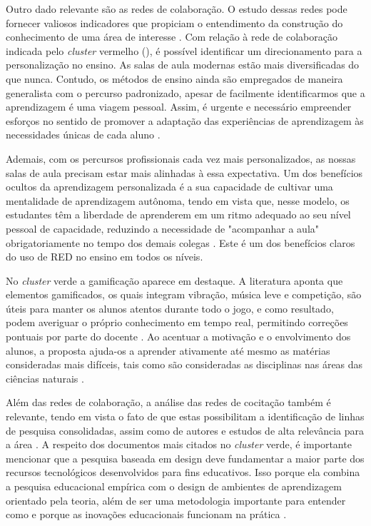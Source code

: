 \documentclass[portuguese]{textolivre}
\begin{document}
Outro dado relevante são as redes de colaboração. O estudo dessas redes pode fornecer valiosos indicadores que propiciam o entendimento da construção do conhecimento de uma área de interesse \cite{hilario_2020}. Com relação à rede de colaboração indicada pelo \textit{cluster} vermelho (), é possível identificar um direcionamento para a personalização no ensino. As salas de aula modernas estão mais diversificadas do que nunca. Contudo, os métodos de ensino ainda são empregados de maneira generalista com o percurso padronizado, apesar de facilmente identificarmos que a aprendizagem é uma viagem pessoal. Assim, é urgente e necessário empreender esforços no sentido de promover a adaptação das experiências de aprendizagem às necessidades únicas de cada aluno \cite{santos_aplicacao_2020}.

Ademais, com os percursos profissionais cada vez mais personalizados, as nossas salas de aula precisam estar mais alinhadas à essa expectativa. Um dos benefícios ocultos da aprendizagem personalizada é a sua capacidade de cultivar uma mentalidade de aprendizagem autônoma, tendo em vista que, nesse modelo, os estudantes têm a liberdade de aprenderem em um ritmo adequado ao seu nível pessoal de capacidade, reduzindo a necessidade de "acompanhar a aula" obrigatoriamente no tempo dos demais colegas \cite{santos_aplicacao_2020}. Este é um dos benefícios claros do uso de RED no ensino em todos os níveis.

No \textit{cluster} verde a gamificação aparece em destaque. A literatura aponta que elementos gamificados, os quais integram vibração, música leve e competição, são úteis para manter os alunos atentos durante todo o jogo, e como resultado, podem averiguar o próprio conhecimento em tempo real, permitindo correções pontuais por parte do docente \cite{lin_kahoot!_2018}. Ao acentuar a motivação e o envolvimento dos alunos, a proposta ajuda-os a aprender ativamente até mesmo as matérias consideradas mais difíceis, tais como são consideradas as disciplinas nas áreas das ciências naturais \cite{jones_kahoot!_2019}.

Além das redes de colaboração, a análise das redes de cocitação também é relevante, tendo em vista o fato de que estas possibilitam a identificação de linhas de pesquisa consolidadas, assim como de autores e estudos de alta relevância para a área \cite{castanha_estudos_2020}. A respeito dos documentos mais citados no \textit{cluster} verde, é importante mencionar que a pesquisa baseada em design deve fundamentar a maior parte dos recursos tecnológicos desenvolvidos para fins educativos. Isso porque ela combina a pesquisa educacional empírica com o design de ambientes de aprendizagem orientado pela teoria, além de ser uma metodologia importante para entender como e porque as inovações educacionais funcionam na prática \cite{kennedy-clark_reflection:_2015}.
\end{document}
